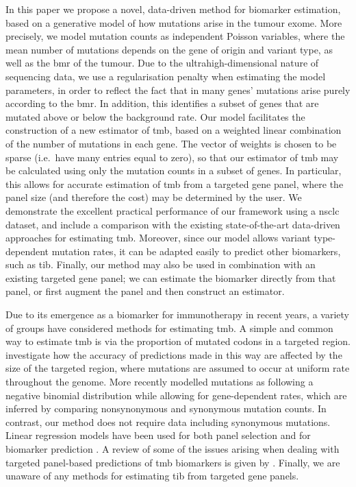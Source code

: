 \documentclass[12pt]{article}
\begin{document}
In this paper we propose a novel, data-driven method for biomarker estimation, based on a generative model of how mutations arise in the tumour exome.  More precisely, we model mutation counts as independent Poisson variables, where the mean number of mutations depends on the gene of origin and variant type, as well as the \gls{bmr} of the tumour. Due to the ultrahigh-dimensional nature of sequencing data, we use a regularisation penalty when estimating the model parameters, in order to reflect the fact that in many genes' mutations arise purely according to the \gls{bmr}. In addition, this identifies a subset of genes that are mutated above or below the background rate. Our model facilitates the construction of a new estimator of \gls{tmb}, based on a weighted linear combination of the number of mutations in each gene. The vector of weights is chosen to be sparse (i.e.~have many entries equal to zero), so that our estimator of \gls{tmb} may be calculated using only the mutation counts in a subset of genes. In particular, this allows for accurate estimation of \gls{tmb} from a targeted gene panel, where the panel size (and therefore the cost) may be determined by the user.  We demonstrate the excellent practical performance of our framework using a \gls{nsclc} dataset, and include a comparison with the existing state-of-the-art data-driven approaches for estimating \gls{tmb}.  Moreover, since our model allows variant type-dependent mutation rates, it can be adapted easily to predict other biomarkers, such as \gls{tib}. Finally, our method may also be used in combination with an existing targeted gene panel; we can estimate the biomarker directly from that panel, or first augment the panel and then construct an estimator.  

Due to its emergence as a biomarker for immunotherapy in recent years, a variety of groups have considered methods for estimating \gls{tmb}. A simple and common way to estimate \gls{tmb} is via the proportion of mutated codons in a targeted region. \citet{budczies_optimizing_2019} investigate how the accuracy of predictions made in this way are affected by the size of the targeted region, where mutations are assumed to occur at uniform rate throughout the genome. More recently \citet{yao_ectmb_2020} modelled mutations as following a negative binomial distribution while allowing for gene-dependent rates, which are inferred by comparing nonsynonymous and synonymous mutation counts. In contrast, our method does not require data including synonymous mutations. Linear regression models have been used for both panel selection \citep{lyu_mutation_2018} and for biomarker prediction \citep{guo_exon_2020}. A review of some of the issues arising when dealing with targeted panel-based predictions of \gls{tmb} biomarkers is given by \citet{wu_designing_2019}. Finally, we are unaware of any methods for estimating \gls{tib} from targeted gene panels. 


\end{document}
